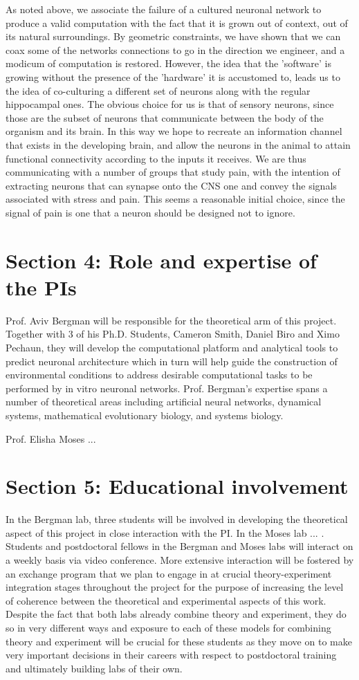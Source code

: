 As noted above, we associate the failure of a cultured neuronal network to produce a valid computation with the fact that it is grown out of context, out of its natural surroundings. By geometric constraints, we have shown that we can coax some of the networks connections to go in the direction we engineer, and a modicum of computation is restored. However, the idea that the 'software' is growing without the presence of the 'hardware' it is accustomed to, leads us to the idea of co-culturing a different set of neurons along with the regular hippocampal ones. The obvious choice for us is that of sensory neurons, since those are the subset of neurons that communicate between the body of the organism and its brain. In this way we hope to recreate an information channel that exists in the developing brain, and allow the neurons in the animal to attain functional connectivity according to the inputs it receives. 
We are thus communicating with a number of groups that study pain, with the intention of extracting neurons that can synapse onto the CNS one and convey the signals associated with stress and pain. This seems a reasonable initial choice, since the signal of pain is one that a neuron should be designed not to ignore.

\section{Section 4: Role and expertise of the PIs}

Prof. Aviv Bergman will be responsible for the theoretical arm of this project. Together with 3 of his Ph.D. Students, Cameron Smith, Daniel Biro and Ximo Pechaun, they will develop the computational platform and analytical tools to predict neuronal architecture which in turn will help guide the construction of environmental conditions to address desirable computational tasks to be performed by in vitro neuronal networks. Prof. Bergman's expertise spans a number of theoretical areas including artificial neural networks, dynamical systems, mathematical evolutionary biology, and systems biology.

Prof. Elisha Moses ...

\section{Section 5: Educational involvement}
In the Bergman lab, three students will be involved in developing the theoretical aspect of this project in close interaction with the PI. In the Moses lab ... . Students and postdoctoral fellows in the Bergman and Moses labs will interact on a weekly basis via video conference. More extensive interaction will be fostered by an exchange program that we plan to engage in at crucial theory-experiment integration stages throughout the project for the purpose of increasing the level of coherence between the theoretical and experimental aspects of this work. Despite the fact that both labs already combine theory and experiment, they do so in very different ways and exposure to each of these models for combining theory and experiment will be crucial for these students as they move on to make very important decisions in their careers with respect to postdoctoral training and ultimately building labs of their own.